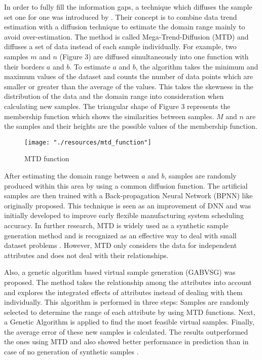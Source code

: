 \documentclass[parskip=full]{scrartcl}
\begin{document}
In order to fully fill the information gaps, a technique which diffuses the sample set one for one was 
introduced by \cite{Li.2007}. Their concept is to combine data trend estimation with a diffusion 
technique to estimate the domain range mainly to avoid over-estimation. The method is called 
Mega-Trend-Diffusion (MTD) and diffuses a set of data instead of each sample individually. For 
example, two samples $\mathit{m}$ and $\mathit{n}$ (Figure 3) are diffused simultaneously into one 
function with their borders $\mathit{a}$ and $\mathit{b}$. To estimate $\mathit{a}$ and $\mathit{b}$, 
the algorithm takes the minimum and maximum values of the dataset and counts the number of data 
points which are smaller or greater than the average of the values. This takes the skewness in the 
distribution of the data and the domain range into consideration when calculating new samples. The 
triangular shape of Figure 3 represents the membership function which shows the similarities between 
samples. $\mathit{M}$ and $\mathit{n}$ are the samples and their heights are 
the possible values of the membership function.

\begin{figure}[H]
	\centering
	\texttt{[image: "./resources/mtd\_function"]}
	\caption{MTD function \cite{Li.2007}}
	\label{fig:mtd-function}
\end{figure}

After estimating the domain range between $\mathit{a}$ and $\mathit{b}$, samples are randomly 
produced within this area by using a common diffusion function. The artificial samples are then trained 
with a Back-propagation Neural Network (BPNN) like \cite{Huang.2004} originally proposed. This 
technique is seen as an improvement of DNN and was initially developed to improve early flexible 
manufacturing system scheduling accuracy. In further research, MTD is widely used as a synthetic 
sample generation method and is recognized as an effective way to deal with small dataset problems 
\cite{AbdulLateh.2017}. However, MTD only considers the data for independent attributes and does not 
deal with their relationships. 

Also, a genetic algorithm based virtual sample generation (GABVSG) was proposed. The method takes 
the relationship among the attributes into account and explores the integrated effects of attributes 
instead of dealing with them individually. This algorithm is performed in three steps: Samples are 
randomly selected to determine the range of each attribute by using MTD functions. Next, a Genetic 
Algorithm is applied to find the most feasible virtual samples. Finally, the average error of these new 
samples is calculated. The results outperformed the ones using MTD and also showed better 
performance in prediction than in case of no generation of synthetic samples \cite{Li.2014}.
\end{document}
